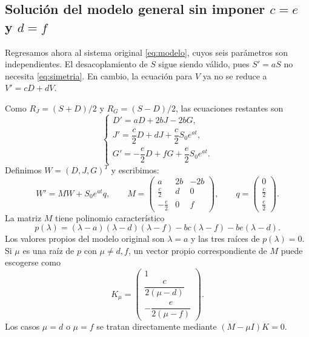 \documentclass[10pt,letterpaper]{article}
\newcommand{\RJ}{R_{J}}
\newcommand{\RG}{R_{G}}
\newcommand{\mat}[1]{\begin{pmatrix}#1\end{pmatrix}}
\begin{document}
\subsection{Solución del modelo general sin imponer $c=e$ y $d=f$}\label{sec:general}
Regresamos ahora al sistema original \eqref{eq:modelo}, cuyos seis parámetros son independientes. El desacoplamiento de $S$ sigue siendo válido, pues $S'=aS$ no necesita \eqref{eq:simetria}. En cambio, la ecuación para $V$ ya no se reduce a $V'=cD+dV$.

Como $\RJ=(S+D)/2$ y $\RG=(S-D)/2$, las ecuaciones restantes son
\begin{equation}\label{eq:gen3}
\begin{cases}
D'=aD+2bJ-2bG,\\[2pt]
J'=\dfrac c2D+dJ+\dfrac c2S_0e^{at},\\[4pt]
G'=-\dfrac e2D+fG+\dfrac e2S_0e^{at}.
\end{cases}
\end{equation}
Definimos $W=(D,J,G)^T$ y escribimos:
\begin{equation}\label{eq:Mq}
W'=MW+S_0e^{at}q,\qquad
M=\mat{a&2b&-2b\\\frac c2&d&0\\-\frac e2&0&f},\qquad
q=\mat{0\\\frac c2\\\frac e2}.
\end{equation}
La matriz $M$ tiene polinomio característico
\begin{equation}\label{eq:cubico}
\boxed{p(\lambda)=(\lambda-a)(\lambda-d)(\lambda-f)
-bc(\lambda-f)-be(\lambda-d).}
\end{equation}
Los valores propios del modelo original son $\lambda=a$ y las tres raíces de $p(\lambda)=0$. Si $\mu$ es una raíz de $p$ con $\mu\ne d,f$, un vector propio correspondiente de $M$ puede escogerse como
\begin{equation}\label{eq:vecM}
K_\mu=\mat{1\\\dfrac{c}{2(\mu-d)}\\-\dfrac{e}{2(\mu-f)}}.
\end{equation}
Los casos $\mu=d$ o $\mu=f$ se tratan directamente mediante $(M-\mu I)K=0$.
\end{document}
